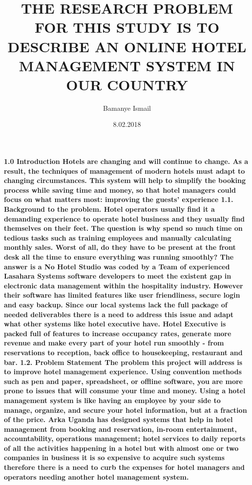 \documentclass{article}
\begin{document}
\title{THE RESEARCH PROBLEM FOR THIS STUDY IS TO DESCRIBE AN ONLINE HOTEL MANAGEMENT SYSTEM IN OUR COUNTRY}
\date{8.02.2018}
\author{Bamanye Ismail}
\maketitle
\paragraph{1.0 Introduction Hotels are changing and will continue to change. As a result, the techniques of
management of modern hotels must adapt to changing circumstances. This system will help
to simplify the booking process while saving time and money, so that hotel managers could focus on what matters most: improving the guests’ experience
1.1. Background to the problem.
Hotel operators usually find it a demanding experience to operate hotel business and they usually find themselves on their feet. The question is why spend so much time on tedious tasks such as training employees and manually calculating monthly sales. Worst of all, do they have to be present at the front desk all the time to ensure everything was running smoothly? The answer is a No
Hotel Studio was coded by a Team of experienced Lasahara Systems software developers to meet the existent gap in electronic data management within the hospitality industry. However their software has limited features like user friendliness, secure login and easy backup. Since our local systems lack the full package of needed deliverables there is a need to address this issue and adapt what other systems like hotel executive have. Hotel Executive is packed full of features to increase occupancy rates, generate more revenue and make every part of your hotel run smoothly - from reservations to reception, back office to housekeeping, restaurant and bar.
1.2. Problem Statement The problem this project will address is to improve hotel management experience. Using convention methods such as pen and paper, spreadsheet, or offline software, you are more prone to issues that will consume your time and money. Using a hotel management system is like having an employee by your side to manage, organize, and secure your hotel information, but at a fraction of the price. Arka Uganda has designed systems that help in hotel management from booking and reservation, in-room entertainment, accountability, operations management; hotel services to daily reports of all the activities happening in a hotel but with almost one or two companies in business it is so expensive to acquire such systems therefore there is a need to curb the expenses for hotel managers and operators needing another hotel management system. 
}
\end{document}
